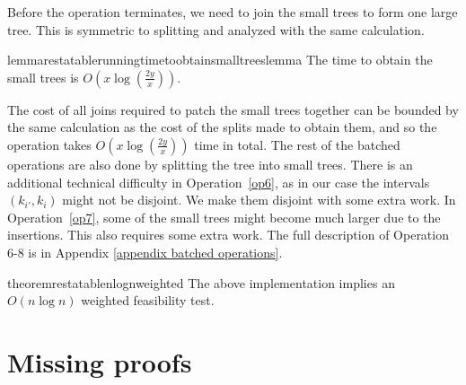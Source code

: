 \documentclass[a4paper,UKenglish]{lipics-v2016}
\theoremstyle{plain}
\begin{document}
Before the operation terminates, we need to join the small trees to form one large tree. This is symmetric to splitting and analyzed with the same
calculation.
\begin{restatable}{lemmarestatable}{runningtimetoobtainsmalltreeslemma}
\label{running time to obtain small trees lemma}
The time to obtain the small trees is $O(x \log (\frac{2y}{x}))$.
\end{restatable}

The cost of all joins required to patch the small trees together can be bounded by the same calculation as the cost of the splits made to obtain them, and so the operation takes $O(x \log (\frac{2y}{x}))$ time in total.
The rest of the batched operations are also done by splitting the tree into small trees. 
There is an additional technical difficulty in Operation~\ref{op6}, as in our case the intervals $(k_{i'},k_{i})$ might not be disjoint. We make them disjoint with some extra work. 
In Operation~\ref{op7}, some of the small trees might become much larger due to the insertions. This also requires some extra work.
The full description of Operation 6-8 is in Appendix \ref{appendix batched operations}.

\begin{restatable}{theoremrestatable}{nlognweighted}
\label{nlogn weighted f.t. theorem}
The above implementation implies an $O(n \log n)$ weighted feasibility test.
\end{restatable}



\newpage
\appendix

\section{Missing proofs}\label{appendix missing proofs}
\end{document}
